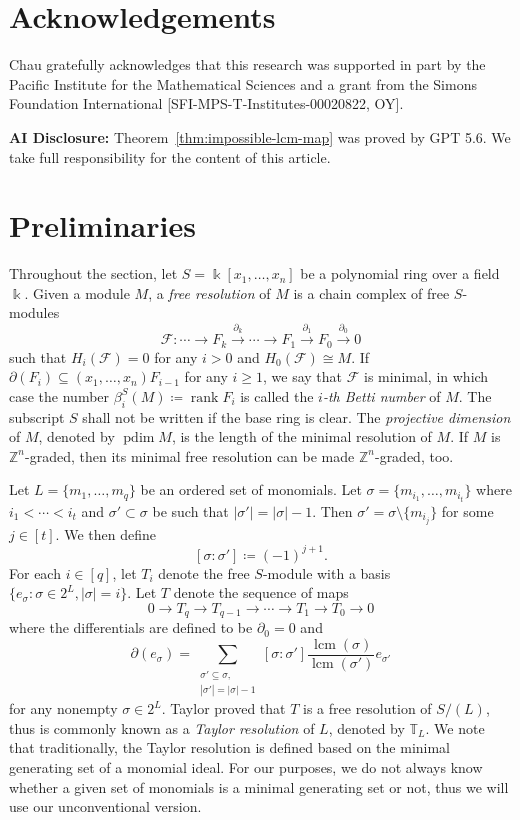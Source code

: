 \documentclass[reqno]{amsart}
\DeclareMathOperator{\lcm}{lcm}
\DeclareMathOperator{\pdim}{pdim}
\newcommand{\TT}{\mathbb{T}}
\theoremstyle{definition}
\theoremstyle{remark}
\numberwithin{equation}{section}
\begin{document}
\section*{Acknowledgements}

Chau gratefully acknowledges that this research was supported in part by the Pacific Institute for the Mathematical Sciences and a grant from the Simons Foundation International [SFI-MPS-T-Institutes-00020822, OY]. 

\textbf{AI Disclosure:} Theorem~\ref{thm:impossible-lcm-map} was proved by GPT 5.6. We take full responsibility for the content of this article.
 
\section{Preliminaries}

Throughout the section, let $S=\Bbbk[x_1,\dots, x_n]$ be  a polynomial ring over a field $\Bbbk$. Given a module $M$, a \emph{free resolution} of $M$ is a chain complex of free $S$-modules
\[
\mathcal{F}: \cdots\to F_k\xrightarrow{\partial_k}\cdots \to F_1\xrightarrow{\partial_1} F_0\xrightarrow{\partial_0} 0
\]
such that $H_i(\mathcal{F})=0$ for any $i>0$ and $H_0(\mathcal{F})\cong M$. If $\partial(F_i)\subseteq (x_1,\dots, x_n)F_{i-1}$ for any $i\geq 1$, we say that $\mathcal{F}$ is minimal, in which case the number $\beta_i^S(M)\coloneqq \operatorname{rank} F_i$ is called the \emph{$i$-th Betti number} of $M$. The subscript $S$ shall not be written if the base ring is clear. The \emph{projective dimension} of $M$, denoted by $\pdim M$, is the length of the minimal resolution of $M$. If $M$ is $\mathbb{Z}^n$-graded, then its minimal free resolution can be made $\mathbb{Z}^n$-graded, too.

Let $L=\{m_1,\dots, m_q\}$ be an ordered set of monomials. Let $\sigma=\{m_{i_1},\dots, m_{i_t}\}$ where $i_1<\cdots <i_t$ and $\sigma'\subset\sigma$ be such that $|\sigma'|=|\sigma|-1$. Then $\sigma'=\sigma\setminus \{m_{i_j}\}$ for some $j\in [t]$. We then define
\[
[\sigma\colon \sigma']\coloneqq (-1)^{j+1}.
\]
For each $i\in [q]$, let $T_i$ denote the free $S$-module with a basis $\{e_\sigma\colon \sigma\in 2^L, |\sigma|=i\}$. Let $T$ denote the sequence of maps
\[
0\to T_q\to T_{q-1}\to \cdots \to T_1\to T_0\to 0
\]
where the differentials are defined to be $\partial_0=0$ and 
\[
\partial(e_\sigma)= \sum_{\substack{\sigma'\subseteq \sigma,\\ |\sigma'|=|\sigma|-1}} [\sigma\colon \sigma'] \frac{\lcm(\sigma)}{\lcm(\sigma')} e_{\sigma'} 
\]
for any nonempty $\sigma\in 2^{L}$. Taylor \cite{T} proved that $T$ is a free resolution of $S/(L)$, thus is commonly known as a \emph{Taylor resolution} of $L$, denoted by $\TT_L$. We note that traditionally, the Taylor resolution is defined based on the minimal generating set of a monomial ideal. For our purposes, we do not always know whether a given set of monomials is a minimal generating set or not, thus we will use our unconventional version.
\end{document}

